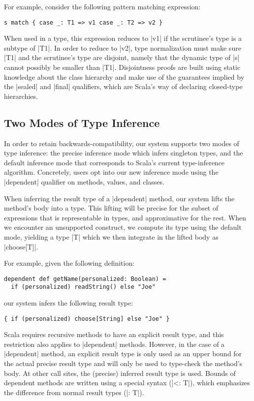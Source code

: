 For example, consider the following pattern matching expression:

\begin{lstlisting}
s match { case _: T1 => v1 case _: T2 => v2 }
\end{lstlisting}

\noindent
When used in a type, this expression reduces to |v1| if the scrutinee's type is a subtype of |T1|.
In order to reduce to |v2|, type normalization must make sure |T1| and the scrutinee's type are disjoint, namely that the dynamic type of |s| cannot possibly be smaller than |T1|.
Disjointness proofs are built using static knowledge about the class hierarchy and make use of the guarantees implied by the |sealed| and |final| qualifiers, which are Scala's way of declaring closed-type hierarchies.

\subsection{Two Modes of Type Inference}

In order to retain backwards-compatibility, our system supports two modes of type inference: the precise inference mode which infers singleton types, and the default inference mode that corresponds to Scala's current type-inference algorithm.
Concretely, users opt into our new inference mode using the |dependent| qualifier on methods, values, and classes.

When inferring the result type of a |dependent| method, our system lifts the method's body into a type.
This lifting will be precise for the subset of expressions that is representable in types, and approximative for the rest.
When we encounter an unsupported construct, we compute its type using the default mode, yielding a type |T| which we then integrate in the lifted body as |choose[T]|.

For example, given the following definition:

\begin{lstlisting}
dependent def getName(personalized: Boolean) =
  if (personalized) readString() else "Joe"
\end{lstlisting}

\noindent
our system infers the following result type:

\begin{lstlisting}
{ if (personalized) choose[String] else "Joe" }
\end{lstlisting}

Scala requires recursive methods to have an explicit result type, and this restriction also applies to |dependent| methods.
However, in the case of a |dependent| method, an explicit result type is only used as an upper bound for the actual precise result type and will only be used to type-check the method's body.
At other call sites, the (precise) inferred result type is used.
Bounds of dependent methods are written using a special syntax (|<: T|), which emphasizes the difference from normal result types (|: T|).

